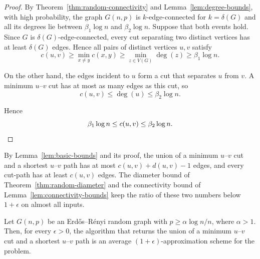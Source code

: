 \begin{proof}
By Theorem~\ref{thm:random-connectivity} and Lemma~\ref{lem:degree-bounds}, with high probability, the graph $G(n, p)$ is $k$-edge-connected for $k = \delta(G)$ and all its degrees lie between $\beta_1 \log n$ and $\beta_2 \log n$.
Suppose that both events hold.
Since $G$ is $\delta(G)$-edge-connected, every cut separating two distinct vertices has at least $\delta(G)$ edges.
Hence all pairs of distinct vertices $u, v$ satisfy
\[
c(u, v) \geq \min_{x \neq y} c(x, y) \geq \min_{z \in V(G)} \deg(z) \geq \beta_1 \log n.
\]

On the other hand, the edges incident to $u$ form a cut that separates $u$ from $v$.
A minimum $u$--$v$ cut has at most as many edges as this cut, so
\[
c(u,v)\leq \deg(u) \leq \beta_2 \log n.
\]

Hence
\[
\beta_1 \log n \leq c(u,v) \leq \beta_2 \log n. \qedhere
\]
\end{proof}

By Lemma~\ref{lem:basic-bounds} and its proof, the union of a minimum $u$--$v$ cut and a shortest $u$--$v$ path has at most $c(u,v) + d(u,v) - 1$ edges, and every cut-path has at least $c(u,v)$ edges.
The diameter bound of Theorem~\ref{thm:random-diameter} and the connectivity bound of Lemma~\ref{lem:connectivity-bounds} keep the ratio of these two numbers below $1+\epsilon$ on almost all inputs.

\begin{theorem}
\label{thm:approximation-scheme}
Let $G(n, p)$ be an Erdős–Rényi random graph with $p \geq \alpha \log n / n$, where $\alpha > 1$.
Then, for every $\epsilon > 0$, the algorithm that returns the union of a minimum $u$--$v$ cut and a shortest $u$--$v$ path is an average $(1+\epsilon)$-approximation scheme for the \MinCutPath{} problem.
\end{theorem}

